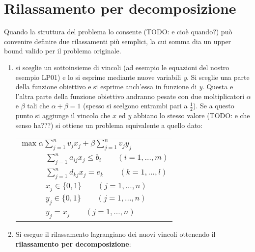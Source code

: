 \documentclass[11pt]{book}
\begin{document}
\section{Rilassamento per decomposizione}

Quando la struttura del problema lo consente (TODO: e cio\`e quando?)
pu\`o convenire definire due rilassamenti pi\`u semplici, la cui
somma dia un upper bound valido per il problema originale.

\begin{enumerate}

\item si sceglie un sottoinsieme di vincoli (ad esempio le equazioni
  del nostro esempio LP01) e lo si esprime mediante nuove variabili
  {\em y}. Si sceglie una parte della funzione obiettivo e si esprime
  anch'essa in funzione di {\em y}. Questa e l'altra parte della
  funzione obiettivo andranno pesate con due moltiplicatori $\alpha$ e
  $\beta$ tali che $\alpha + \beta = 1$ (spesso si scelgono entrambi
  pari a $\frac{1}{2}$). Se a questo punto si aggiunge il vincolo che
  $x$ ed $y$ abbiano lo stesso valore (TODO: e che senso ha???) si
  ottiene un problema equivalente a quello dato:

  \vspace{11pt}
  \begin{center}
    \begin{tabular}{l}
      $\max \alpha \sum \limits_{j=1}^n v_j x_j + \beta
      \sum\limits_{j=1}^n v_jy_j$\\
      $\phantom{= max} \sum \limits_{j=1}^n a_{ij}x_j \leq b_i \qquad (i=1,\dots,m)$\\
      $\phantom{= max} \sum \limits_{j=1}^n d_{kj}x_j = e_k \qquad (k=1,\dots,l)$\\
      $\phantom{= max} x_j \in \{0,1\} \qquad (j=1,\dots,n)$\\
      $\phantom{= max} y_j \in \{0,1\} \qquad (j=1,\dots,n)$\\
      $\phantom{= max} y_j = x_j \qquad (j=1,\dots,n)$\\
    \end{tabular}
  \end{center}
  \vspace{11pt}    

\item Si esegue il rilassamento lagrangiano dei nuovi vincoli
  ottenendo il {\bf rilassamento per decomposizione}:


\end{enumerate}
\end{document}
